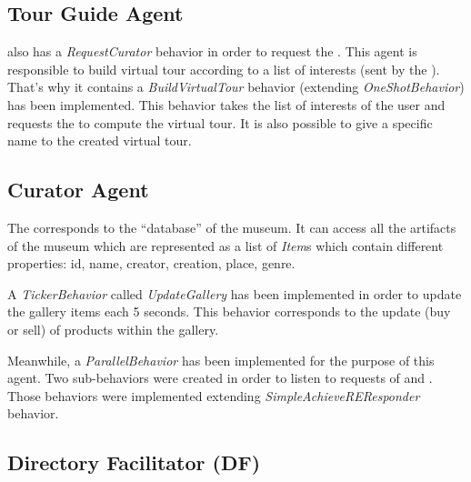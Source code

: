 \documentclass[a4paper,11pt]{article}
\begin{document}
  \subsection{Tour Guide Agent}
  
  
  \to{} also has a \textit{RequestCurator} behavior in order to request the \cu{}. This agent is responsible to build virtual tour 
  according to a list of interests (sent by the \pa{}). That's why it contains a \textit{BuildVirtualTour} behavior (extending \textit{OneShotBehavior}) 
  has been implemented. This behavior takes the list of interests of the user and requests the \cu{} to compute 
  the virtual tour. It is also possible to give a specific name to the created virtual tour.
  
  \subsection{Curator Agent}
  
  The \cu{} corresponds to the ``database'' of the museum. It can access all the artifacts of the museum which are represented as a list 
  of \textit{Item}s which contain different properties: id, name, creator, creation, place, genre.
  
  A \textit{TickerBehavior} called \textit{UpdateGallery} has been implemented in order to update the gallery items each 5 seconds. This 
  behavior corresponds to the update (buy or sell) of products within the gallery.
  
  Meanwhile, a \textit{ParallelBehavior} has been implemented for the purpose of this agent. Two sub-behaviors were created in order to 
  listen to requests of \to{} and \pa{}. Those behaviors were implemented extending \textit{SimpleAchieveREResponder} behavior.



  
  \subsection{Directory Facilitator (DF)}
\end{document}
